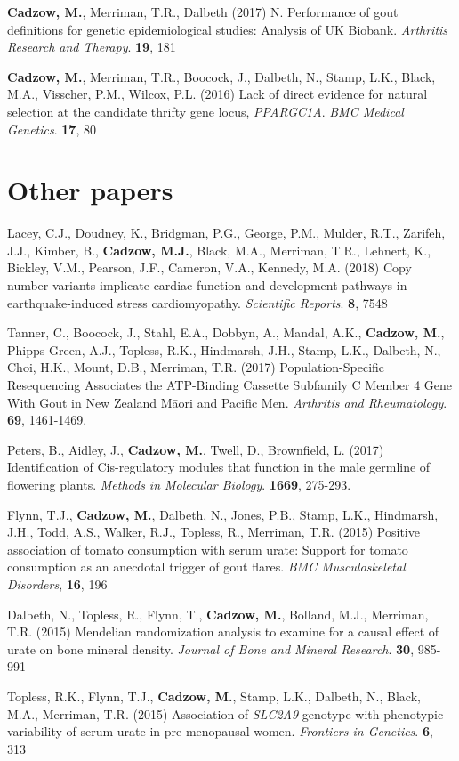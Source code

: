 \documentclass[twoside,openright]{report}
\begin{document}
\begin{appendices}
\textbf{Cadzow, M.}, Merriman, T.R., Dalbeth (2017) N. Performance of
gout definitions for genetic epidemiological studies: Analysis of UK
Biobank. \emph{Arthritis Research and Therapy}. \textbf{19}, 181

\textbf{Cadzow, M.}, Merriman, T.R., Boocock, J., Dalbeth, N., Stamp,
L.K., Black, M.A., Visscher, P.M., Wilcox, P.L. (2016) Lack of direct
evidence for natural selection at the candidate thrifty gene locus,
\emph{PPARGC1A}. \emph{BMC Medical Genetics}. \textbf{17}, 80

\section{Other papers}\label{other-papers}

Lacey, C.J., Doudney, K., Bridgman, P.G., George, P.M., Mulder, R.T.,
Zarifeh, J.J., Kimber, B., \textbf{Cadzow, M.J.}, Black, M.A., Merriman,
T.R., Lehnert, K., Bickley, V.M., Pearson, J.F., Cameron, V.A., Kennedy,
M.A. (2018) Copy number variants implicate cardiac function and
development pathways in earthquake-induced stress cardiomyopathy.
\emph{Scientific Reports}. \textbf{8}, 7548

Tanner, C., Boocock, J., Stahl, E.A., Dobbyn, A., Mandal, A.K.,
\textbf{Cadzow, M.}, Phipps-Green, A.J., Topless, R.K., Hindmarsh, J.H.,
Stamp, L.K., Dalbeth, N., Choi, H.K., Mount, D.B., Merriman, T.R. (2017)
Population-Specific Resequencing Associates the ATP-Binding Cassette
Subfamily C Member 4 Gene With Gout in New Zealand Māori and Pacific
Men. \emph{Arthritis and Rheumatology}. \textbf{69}, 1461-1469.

Peters, B., Aidley, J., \textbf{Cadzow, M.}, Twell, D., Brownfield, L.
(2017) Identification of Cis-regulatory modules that function in the
male germline of flowering plants. \emph{Methods in Molecular Biology}.
\textbf{1669}, 275-293.

Flynn, T.J., \textbf{Cadzow, M.}, Dalbeth, N., Jones, P.B., Stamp, L.K.,
Hindmarsh, J.H., Todd, A.S., Walker, R.J., Topless, R., Merriman, T.R.
(2015) Positive association of tomato consumption with serum urate:
Support for tomato consumption as an anecdotal trigger of gout flares.
\emph{BMC Musculoskeletal Disorders}, \textbf{16}, 196

Dalbeth, N., Topless, R., Flynn, T., \textbf{Cadzow, M.}, Bolland, M.J.,
Merriman, T.R. (2015) Mendelian randomization analysis to examine for a
causal effect of urate on bone mineral density. \emph{Journal of Bone
and Mineral Research}. \textbf{30}, 985-991

Topless, R.K., Flynn, T.J., \textbf{Cadzow, M.}, Stamp, L.K., Dalbeth,
N., Black, M.A., Merriman, T.R. (2015) Association of \emph{SLC2A9}
genotype with phenotypic variability of serum urate in pre-menopausal
women. \emph{Frontiers in Genetics}. \textbf{6}, 313

\end{appendices}
\end{document}
